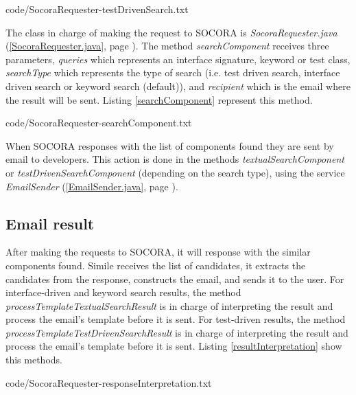 
{code/SocoraRequester-testDrivenSearch.txt}

The class in charge of making the request to SOCORA is \emph{SocoraRequester.java} (\ref{SocoraRequester.java}, page \pageref{SocoraRequester.java}). The method \emph{searchComponent} receives three parameters, \emph{queries} which represents an interface signature, keyword or test class, \emph{searchType} which represents the type of search (i.e. test driven search, interface driven search or keyword search (default)), and \emph{recipient} which is the email where the result will be sent. Listing \ref{searchComponent} represent this method.


{code/SocoraRequester-searchComponent.txt}

When SOCORA responses with the list of components found they are sent by email to developers. This action is done in the methods \emph{textualSearchComponent} or \emph{testDrivenSearchComponent} (depending on the search type), using the service \emph{EmailSender} (\ref{EmailSender.java}, page \pageref{EmailSender.java}).

\subsection{Email result}
After making the requests to SOCORA, it will response with the similar components found. Simile receives the list of candidates, it extracts the candidates from the response, constructs the email, and sends it to the user. For interface-driven and keyword search results, the method \emph{processTemplateTextualSearchResult} is in charge of interpreting the result and process the email's template before it is sent. For test-driven results, the method \emph{processTemplateTestDrivenSearchResult} is in charge of interpreting the result and process the email's template before it is sent. Listing \ref{resultInterpretation} show this methods.


{code/SocoraRequester-responseInterpretation.txt}

